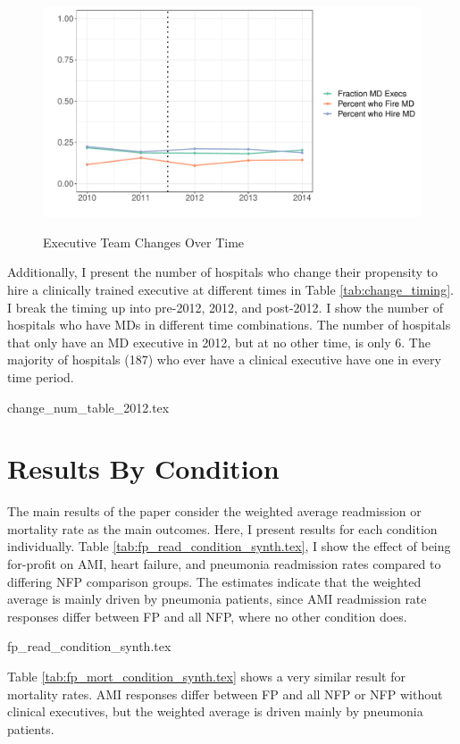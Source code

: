\documentclass[12pt]{article}
\begin{document}
\begin{figure}[ht!]
    \centering
    \caption{Executive Team Changes Over Time}
    \includegraphics[width=\textwidth]{Objects/change_graph.pdf}
    \label{fig:change_graph}
\end{figure}

Additionally, I present the number of hospitals who change their propensity to hire a clinically trained executive at different times in Table \ref{tab:change_timing}. I break the timing up into pre-2012, 2012, and post-2012. I show the number of hospitals who have MDs in different time combinations. The number of hospitals that only have an MD executive in 2012, but at no other time, is only 6. The majority of hospitals (187) who ever have a clinical executive have one in every time period. 

{change_num_table_2012.tex}

\section{Results By Condition}\label{app:condition}

The main results of the paper consider the weighted average readmission or mortality rate as the main outcomes. Here, I present results for each condition individually. Table \ref{tab:fp_read_condition_synth.tex}, I show the effect of being for-profit on AMI, heart failure, and pneumonia readmission rates compared to differing NFP comparison groups. The estimates indicate that the weighted average is mainly driven by pneumonia patients, since AMI readmission rate responses differ between FP and all NFP, where no other condition does. 

{fp_read_condition_synth.tex}

Table \ref{tab:fp_mort_condition_synth.tex} shows a very similar result for mortality rates. AMI responses differ between FP and all NFP or NFP without clinical executives, but the weighted average is driven mainly by pneumonia patients. 
\end{document}
